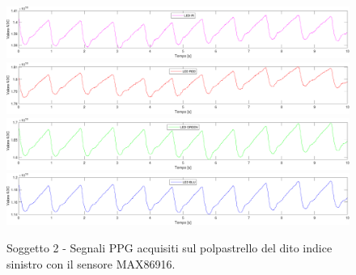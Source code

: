 \begin{figure}[h]
	\centering
	\includegraphics[width=1\linewidth]{ImageFiles/Misure Preliminari/Soggetto 2/max86916/polpastrello_ired}
	\includegraphics[width=1\linewidth]{ImageFiles/Misure Preliminari/Soggetto 2/max86916/polpastrello_red}
	\includegraphics[width=1\linewidth]{ImageFiles/Misure Preliminari/Soggetto 2/max86916/polpastrello_green}
	\includegraphics[width=1\linewidth]{ImageFiles/Misure Preliminari/Soggetto 2/max86916/polpastrello_blu}
	\caption{Soggetto 2 - Segnali PPG acquisiti sul polpastrello del dito indice sinistro con il sensore MAX86916.}
	\label{fig:soggetto2_MAX86916_polpastrello}
\end{figure}

\clearpage

